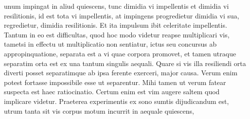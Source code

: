 unum impingat in
aliud quiescens, %
tunc  
dimidia %
vi%
\protect{} impellentis et dimidia vi resilitionis,%
\protect{} id est tota 
vi impellentis, at %
impingens progredietur dimidia vi sua, regredietur, %
dimidia resilitionis.%
\protect{}
Et ita
impulsum ibit celeritate impellentis. Tantum in eo est difficultas, quod hoc modo videtur reapse multiplicari vis,%
\protect{} tametsi in effectu 
  {}
ut multiplicatio non sentiatur, %
  {}
ictus%
\protect{} seu concursus ab appropinquatione,%
\protect{}%
\protect{} %
separata est a vi quae corpora promovet, %
et tamen
utraque separatim orta est ex una tantum singulis aequali. Quare si vis illa resiliendi%
\protect{} orta diverti
posset separatimque ab ipsa ferente%
\protect{} 
exerceri,
  {}
major causa.%
\protect{} Verum
enim 
  {}
potest fortasse impossibile esse ut separentur. Mihi
tamen ut verum fatear suspecta 
est haec ratiocinatio. Certum enim est vim%
\protect{} augere saltem 
  {}
quod implicare videtur. 
\pend
\pstart
Praeterea experimentis ex sono%
\protect{} sumtis%
\protect{} dijudicandum est, utrum
tanta sit vis 
  {}
corpus motum incurrit in aequale quiescens,
